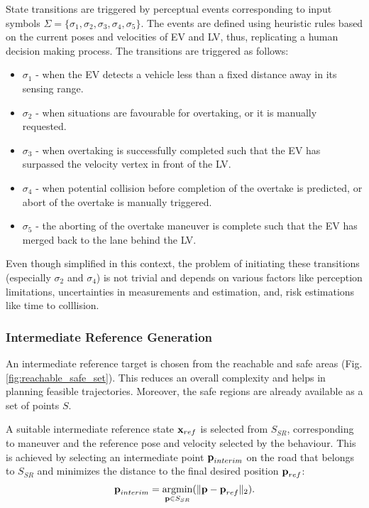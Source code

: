 \documentclass[letterpaper, 10 pt, conference]{ieeeconf}
\DeclareMathOperator*{\argmin}{argmin}
\begin{document}
State transitions are triggered by perceptual events corresponding to input symbols $\Sigma = \{\sigma_1, \sigma_2, \sigma_3,  \sigma_4, \sigma_5\}$. 
The events are defined using heuristic rules based on the current poses and velocities of EV and LV, thus, replicating a human decision making process. 
The transitions are triggered as follows: 
\begin{itemize}
    \item \textbf{$\sigma_1$} - when the EV detects a vehicle less than a fixed distance away in its sensing range.
    \item \textbf{$\sigma_2$} - when situations are favourable for overtaking, or it is manually requested.
    \item \textbf{$\sigma_3$} - when overtaking is successfully completed such that the EV has surpassed the velocity vertex in front of the LV. 
    \item \textbf{$\sigma_4$} - when potential collision before completion of the overtake is predicted, or abort of the overtake is manually triggered.
    \item \textbf{$\sigma_5$} - the aborting of the overtake maneuver is complete such that the EV has merged back to the lane behind the LV.
\end{itemize}
Even though simplified in this context, the problem of initiating these transitions (especially $\sigma_2$ and $\sigma_4$) is not trivial and depends on various factors like perception limitations, uncertainties in measurements and estimation, and, risk estimations like time to colllision.

\subsubsection{Intermediate Reference Generation}
\label{section:intermediateRefGeneration}

An intermediate reference target is chosen from the reachable and safe areas (Fig. \ref{fig:reachable_safe_set}). This reduces an overall complexity and helps in planning feasible trajectories. Moreover, the safe regions are already available as a set of points $S$.\

A suitable intermediate reference state $\textbf{\text{x}}_{ref}$ is selected from $S_{SR}$, corresponding to maneuver and the reference pose and velocity selected by the behaviour. This is achieved by selecting an intermediate point $\textbf{\text{p}}_{interim}$ on the road that belongs to $S_{SR}$ and minimizes the distance to the final desired position $\textbf{\text{p}}_{ref}$: 
\begin{equation} \label{intermediatepref}
    \textbf{\text{p}}_{interim} = \argmin_{\textbf{\text{p}}\in S_{SR}}(\| \textbf{\text{p}}-\textbf{\text{p}}_{ref}\|_2).
\end{equation}
\end{document}

